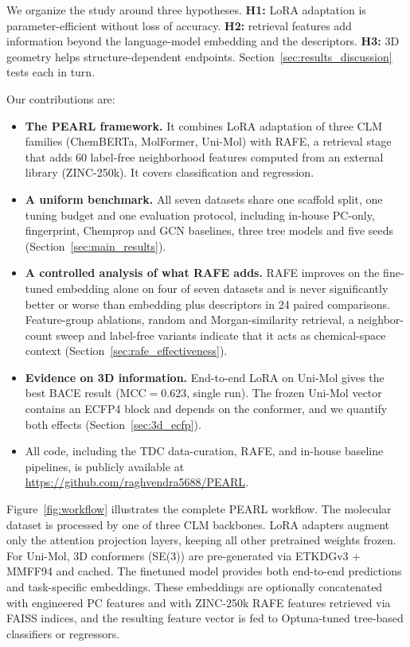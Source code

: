 \documentclass[pdflatex,sn-mathphys-num]{sn-jnl}%
\begin{document}
We organize the study around three hypotheses. \textbf{H1:} LoRA adaptation is parameter-efficient without loss of accuracy. \textbf{H2:} retrieval features add information beyond the language-model embedding and the descriptors. \textbf{H3:} 3D geometry helps structure-dependent endpoints. Section~\ref{sec:results_discussion} tests each in turn.

Our contributions are:
\begin{itemize}
  \item \textbf{The PEARL framework.} It combines LoRA adaptation of three CLM families (ChemBERTa, MolFormer, Uni-Mol) with RAFE, a retrieval stage that adds 60 label-free neighborhood features computed from an external library (ZINC-250k). It covers classification and regression.
  \item \textbf{A uniform benchmark.} All seven datasets share one scaffold split, one tuning budget and one evaluation protocol, including in-house PC-only, fingerprint, Chemprop and GCN baselines, three tree models and five seeds (Section~\ref{sec:main_results}).
  \item \textbf{A controlled analysis of what RAFE adds.} RAFE improves on the fine-tuned embedding alone on four of seven datasets and is never significantly better or worse than embedding plus descriptors in 24 paired comparisons. Feature-group ablations, random and Morgan-similarity retrieval, a neighbor-count sweep and label-free variants indicate that it acts as chemical-space context (Section~\ref{sec:rafe_effectiveness}).
  \item \textbf{Evidence on 3D information.} End-to-end LoRA on Uni-Mol gives the best BACE result (MCC$=0.623$, single run). The frozen Uni-Mol vector contains an ECFP4 block and depends on the conformer, and we quantify both effects (Section~\ref{sec:3d_ecfp}).
  \item All code, including the TDC data-curation, RAFE, and in-house baseline pipelines, is publicly available at \url{https://github.com/raghvendra5688/PEARL}.
\end{itemize}

Figure~\ref{fig:workflow} illustrates the complete PEARL workflow. The molecular dataset is processed by one of three CLM backbones. LoRA adapters augment only the attention projection layers, keeping all other pretrained weights frozen. For Uni-Mol, 3D conformers (SE(3)) are pre-generated via ETKDGv3 + MMFF94 and cached. The finetuned model provides both end-to-end predictions and task-specific embeddings. These embeddings are optionally concatenated with engineered PC features and with ZINC-250k RAFE features retrieved via FAISS indices, and the resulting feature vector is fed to Optuna-tuned tree-based classifiers or regressors.
\end{document}

